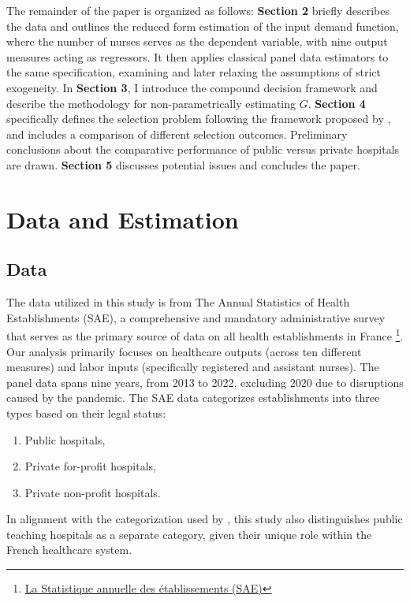 \documentclass[12pt]{article}
\begin{document}
The remainder of the paper is organized as follows: \textbf{Section 2} briefly
describes the data and outlines the reduced form estimation of the input demand
function, where the number of nurses serves as the dependent variable, with
nine output measures acting as regressors. It then applies classical panel data
estimators to the same specification, examining and later relaxing the
assumptions of strict exogeneity. In \textbf{Section 3}, I introduce the
compound decision framework and describe the methodology for non-parametrically
estimating $G$. \textbf{Section 4} specifically defines the selection problem
following the framework proposed by \cite{gu2023invidious}, and includes a
comparison of different selection outcomes. Preliminary conclusions about the
comparative performance of public versus private hospitals are drawn.
\textbf{Section 5} discusses potential issues and concludes the paper.

\section{Data and Estimation}
\subsection{Data}

The data utilized in this study is from The Annual Statistics of Health
Establishments (SAE), a comprehensive and mandatory administrative survey that
serves as the primary source of data on all health establishments in France
\footnote{\href{https://data.drees.solidarites-sante.gouv.fr/explore/dataset/708_bases-statistiques-sae/information/}{La
        Statistique annuelle des établissements (SAE)}}. Our analysis primarily focuses
on healthcare outputs (across ten different measures) and labor inputs
(specifically registered and assistant nurses). The panel data spans nine
years, from 2013 to 2022, excluding 2020 due to disruptions caused by the
pandemic. The SAE data categorizes establishments into three types based on
their legal status:

\begin{enumerate}
    \item Public hospitals,
    \item Private for-profit hospitals,
    \item Private non-profit hospitals.
\end{enumerate}

In alignment with the categorization used by \citet{croiset2024hospitals}, this
study also distinguishes public teaching hospitals as a separate category,
given their unique role within the French healthcare system.
\end{document}
